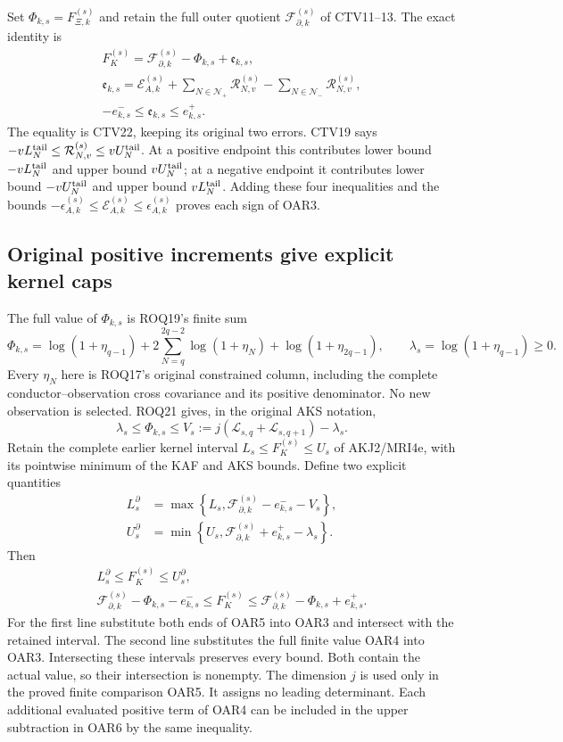 \documentclass[11pt,a4paper]{article}
\begin{document}
Set $\Phi_{k,s}=F_{\Xi,k}^{(s)}$ and retain the full outer quotient
$\mathcal F_{\partial,k}^{(s)}$ of CTV11--13. The exact identity is
\[
 \begin{gathered}
 F_K^{(s)}=\mathcal F_{\partial,k}^{(s)}-\Phi_{k,s}+\mathfrak e_{k,s},\\
 \mathfrak e_{k,s}=\mathcal E_{A,k}^{(s)}
     +\sum_{N\in\mathcal N_+}\mathcal R_{N,v}^{(s)}
     -\sum_{N\in\mathcal N_-}\mathcal R_{N,v}^{(s)},\\
 -e_{k,s}^-\le\mathfrak e_{k,s}\le e_{k,s}^+.
 \end{gathered}\tag{OAR3}
\]
The equality is CTV22, keeping its original two errors. CTV19 says
$-vL_N^{\rm tail}\le\mathcal R_{N,v}^{(s)}\le vU_N^{\rm tail}$.
At a positive endpoint this contributes lower bound $-vL_N^{\rm tail}$
and upper bound $vU_N^{\rm tail}$; at a negative endpoint it
contributes lower bound $-vU_N^{\rm tail}$ and upper bound
$vL_N^{\rm tail}$. Adding these four inequalities and the bounds
$-\epsilon_{A,k}^{(s)}\le\mathcal E_{A,k}^{(s)}
\le\epsilon_{A,k}^{(s)}$ proves each sign of OAR3.

\subsection{Original positive increments give explicit kernel caps}
The full value of $\Phi_{k,s}$ is ROQ19's finite sum
\[
 \Phi_{k,s}=\log(1+\eta_{q-1})
       +2\sum_{N=q}^{2q-2}\log(1+\eta_N)
       +\log(1+\eta_{2q-1}),\qquad
 \lambda_s=\log(1+\eta_{q-1})\ge0.
 \tag{OAR4}
\]
Every $\eta_N$ here is ROQ17's original constrained column, including
the complete conductor--observation cross covariance and its
positive denominator. No new observation is selected.
ROQ21 gives, in the original AKS notation,
\[
 \lambda_s\le\Phi_{k,s}\le
 V_s:=j(\mathcal L_{s,q}+\mathcal L_{s,q+1})-\lambda_s.
 \tag{OAR5}
\]
Retain the complete earlier kernel interval $L_s\le F_K^{(s)}\le U_s$
of AKJ2/MRI4e, with its pointwise minimum of the KAF and AKS bounds.
Define two explicit quantities
\[
 \begin{split}
 L_s^{\partial}&=\max\left\{L_s,
       \mathcal F_{\partial,k}^{(s)}-e_{k,s}^--V_s\right\},\\
 U_s^{\partial}&=\min\left\{U_s,
       \mathcal F_{\partial,k}^{(s)}+e_{k,s}^+-\lambda_s\right\}.
 \end{split}\tag{OAR6}
\]
Then
\[
 \begin{gathered}
 L_s^{\partial}\le F_K^{(s)}\le U_s^{\partial},\\
 \mathcal F_{\partial,k}^{(s)}-\Phi_{k,s}-e_{k,s}^-
       \le F_K^{(s)}
       \le\mathcal F_{\partial,k}^{(s)}-\Phi_{k,s}+e_{k,s}^+.
 \end{gathered}\tag{OAR7}
\]
For the first line substitute both ends of OAR5 into OAR3 and
intersect with the retained interval. The second line substitutes
the full finite value OAR4 into OAR3. Intersecting these intervals
preserves every bound. Both contain the actual value, so their
intersection is nonempty. The dimension $j$ is used only in the
proved finite comparison OAR5. It assigns no leading determinant.
Each additional evaluated positive term of OAR4 can be included
in the upper subtraction in OAR6 by the same inequality.
\end{document}

